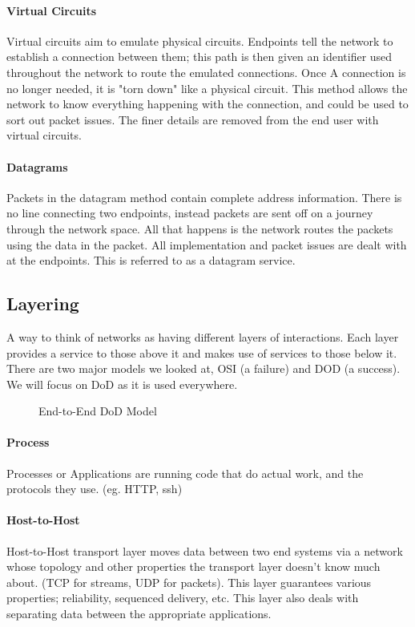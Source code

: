 \paragraph{Virtual Circuits}
Virtual circuits aim to emulate physical circuits. Endpoints tell the network to establish a connection between them; this path is then given an identifier used throughout the network to route the emulated connections. Once A connection is no longer needed, it is "torn down" like a physical circuit. This method allows the network to know everything happening with the connection, and could be used to sort out packet issues. The finer details are removed from the end user with virtual circuits.
\paragraph{Datagrams}
Packets in the datagram method contain complete address information. There is no line connecting two endpoints, instead packets are sent off on a journey through the network space. All that happens is the network routes the packets using the data in the packet. All implementation and packet issues are dealt with at the endpoints. This is referred to as a datagram service.
\subsection{Layering}
A way to think of networks as having different layers of interactions. Each layer provides a service to those above it and makes use of services to those below it. There are two major models we looked at, OSI (a failure) and DOD (a success). We will focus on DoD as it is used everywhere.
   \begin{figure}[!htb]
	\caption{\label{fig:dodmodel} End-to-End DoD Model}
\end{figure}
\paragraph{Process}
Processes or Applications are running code that do actual work, and the protocols they use. (eg. HTTP, ssh)
\paragraph{Host-to-Host}
Host-to-Host transport layer moves data between two end systems via a network whose topology and other properties the transport layer doesn't know much about. (TCP for streams, UDP for packets). This layer guarantees various properties; reliability, sequenced delivery, etc. This layer also deals with separating data between the appropriate applications.
